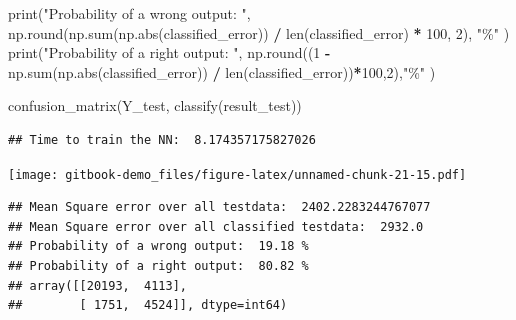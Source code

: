 \documentclass[
]{book}
\newenvironment{Shaded}{\begin{snugshade}}{\end{snugshade}}
\newcommand{\BuiltInTok}[1]{#1}
\newcommand{\DecValTok}[1]{\textcolor[rgb]{0.00,0.00,0.81}{#1}}
\newcommand{\NormalTok}[1]{#1}
\newcommand{\OperatorTok}[1]{\textcolor[rgb]{0.81,0.36,0.00}{\textbf{#1}}}
\newcommand{\StringTok}[1]{\textcolor[rgb]{0.31,0.60,0.02}{#1}}
\begin{document}
\begin{Shaded}
\begin{Highlighting}[]
\BuiltInTok{print}\NormalTok{(}\StringTok{"Probability of a wrong output: "}\NormalTok{, np.}\BuiltInTok{round}\NormalTok{(np.}\BuiltInTok{sum}\NormalTok{(np.}\BuiltInTok{abs}\NormalTok{(classified\_error)) }\OperatorTok{/} \BuiltInTok{len}\NormalTok{(classified\_error) }\OperatorTok{*} \DecValTok{100}\NormalTok{, }\DecValTok{2}\NormalTok{), }\StringTok{"\%"}\NormalTok{ )}
\BuiltInTok{print}\NormalTok{(}\StringTok{"Probability of a right output: "}\NormalTok{, np.}\BuiltInTok{round}\NormalTok{((}\DecValTok{1} \OperatorTok{{-}}\NormalTok{ np.}\BuiltInTok{sum}\NormalTok{(np.}\BuiltInTok{abs}\NormalTok{(classified\_error)) }\OperatorTok{/} \BuiltInTok{len}\NormalTok{(classified\_error))}\OperatorTok{*}\DecValTok{100}\NormalTok{,}\DecValTok{2}\NormalTok{),}\StringTok{"\%"}\NormalTok{ )}


\NormalTok{confusion\_matrix(Y\_test, classify(result\_test))}
\end{Highlighting}
\end{Shaded}

\begin{verbatim}
## Time to train the NN:  8.174357175827026
\end{verbatim}

\texttt{[image: gitbook-demo\_files/figure-latex/unnamed-chunk-21-15.pdf]}

\begin{verbatim}
## Mean Square error over all testdata:  2402.2283244767077
## Mean Square error over all classified testdata:  2932.0
## Probability of a wrong output:  19.18 %
## Probability of a right output:  80.82 %
## array([[20193,  4113],
##        [ 1751,  4524]], dtype=int64)
\end{verbatim}
\end{document}
